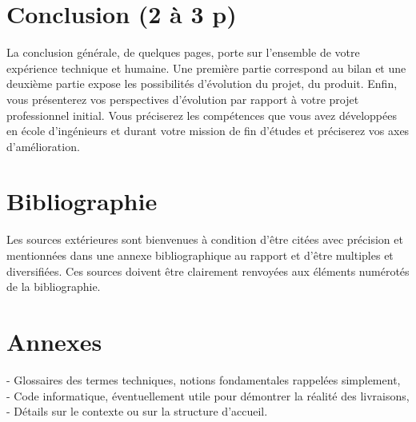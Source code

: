 \documentclass[11pt]{article}
\begin{document}
  \pagebreak
  \section{Conclusion (2 à 3 p)}
  La conclusion générale, de quelques pages, porte sur l’ensemble de votre expérience technique et
  humaine. Une première partie correspond au bilan et une deuxième partie expose les possibilités
  d’évolution du projet, du produit. Enfin, vous présenterez vos perspectives d’évolution par rapport à
  votre projet professionnel initial. Vous préciserez les compétences que vous avez développées en
  école d’ingénieurs et durant votre mission de fin d’études et préciserez vos axes d’amélioration.

  \pagebreak
  \section{Bibliographie}
  Les sources extérieures sont bienvenues à condition d’être citées avec précision et mentionnées dans
  une annexe bibliographique au rapport et d’être multiples et diversifiées.
  Ces sources doivent être clairement renvoyées aux éléments numérotés de la bibliographie.

  \pagebreak
  \section{Annexes}
  - Glossaires des termes techniques, notions fondamentales rappelées simplement, \\
  - Code informatique, éventuellement utile pour démontrer la réalité des livraisons, \\
  - Détails sur le contexte ou sur la structure d’accueil. 
\end{document}
